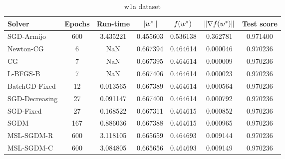 \begin{table}
\centering
\caption{w1a dataset}
\label{tab:w1a-table}
\begin{tabular}{lS[drop-zero-decimal]S[round-precision=4]S[round-precision=6]S[round-precision=6]S[exponent-mode=scientific]S[round-precision=6]}
\toprule
Solver & {Epochs} & {Run-time} & {$\lVert w^\ast\rVert$} & {$\operatorname*{\mathit{f}}(w^\ast)$} & {$\lVert\nabla f(w^\ast)\rVert$} & {Test score} \\
\midrule
SGD-Armijo & 600 & 3.435221 & 0.455603 & 0.536138 & 0.362781 & 0.971400 \\
Newton-CG & 6 & NaN & 0.667394 & 0.464614 & 0.000046 & 0.970236 \\
CG & 7 & NaN & 0.667395 & 0.464614 & 0.000009 & 0.970236 \\
L-BFGS-B & 7 & NaN & 0.667406 & 0.464614 & 0.000023 & 0.970236 \\
BatchGD-Fixed & 12 & 0.013565 & 0.667389 & 0.464614 & 0.000564 & 0.970236 \\
SGD-Decreasing & 27 & 0.091147 & 0.667400 & 0.464614 & 0.000792 & 0.970236 \\
SGD-Fixed & 27 & 0.168522 & 0.667311 & 0.464615 & 0.000852 & 0.970236 \\
SGDM & 167 & 0.886036 & 0.667388 & 0.464615 & 0.000965 & 0.970236 \\
MSL-SGDM-R & 600 & 3.118105 & 0.665659 & 0.464693 & 0.009144 & 0.970236 \\
MSL-SGDM-C & 600 & 3.084805 & 0.665656 & 0.464693 & 0.009149 & 0.970236 \\
\bottomrule
\end{tabular}
\end{table}

